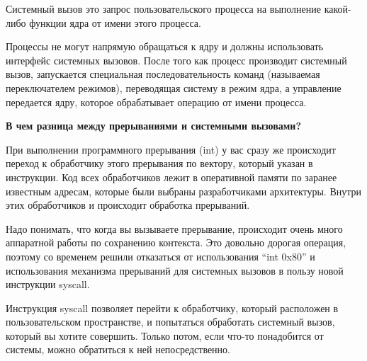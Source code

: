 \begin{defi}{Системный вызов}
	 это запрос пользовательского процесса на выполнение какой-либо функции ядра от имени этого процесса.
\end{defi}

Процессы не могут напрямую обращаться к ядру и должны использовать интерфейс системных вызовов. После того как процесс производит системный вызов, запускается специальная последовательность команд (называемая переключателем режимов), переводящая систему в режим ядра, а управление передается ядру, которое обрабатывает операцию от имени процесса.

\textbf{В чем разница между прерываниями и системными вызовами?}

При выполнении программного прерывания (int) у вас сразу же происходит переход к обработчику этого прерывания по вектору, который указан в инструкции. Код всех обработчиков лежит в оперативной памяти по заранее известным адресам, которые были выбраны разработчиками архитектуры. Внутри этих обработчиков и происходит обработка прерываний. 

Надо понимать, что когда вы вызываете прерывание, происходит очень много аппаратной работы по сохранению контекста. Это довольно дорогая операция, поэтому со временем решили отказаться от использования “int 0x80” и использования механизма прерываний для системных вызовов в пользу новой инструкции syscall. 

Инструкция syscall позволяет перейти к обработчику, который расположен в пользовательском пространстве, и попытаться обработать системный вызов, который вы хотите совершить. Только потом, если что-то понадобится от системы, можно обратиться к ней непосредственно.